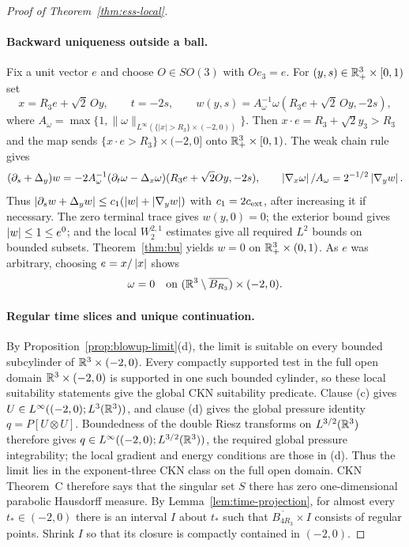 \documentclass[11pt,letterpaper]{article}
\numberwithin{equation}{section}
\theoremstyle{plain}
\theoremstyle{definition}
\theoremstyle{remark}
\begin{document}
\begin{proof}[Proof of Theorem~\ref{thm:ess-local}]
\paragraph{Backward uniqueness outside a ball.}
Fix a unit vector $e$ and choose $O\in SO(3)$ with $Oe_3=e$. For
$(y,s)\in\mathbb{R}^3_+\times[0,1)$ set
\[
 x=R_3e+\sqrt{2}\,Oy,\qquad t=-2s,\qquad
 w(y,s)=A_\omega^{-1}\omega(R_3e+\sqrt{2}\,Oy,-2s),
\]
where $A_\omega=\max\{1,\|\omega\|_{L^\infty(\{|x|>R_3\}\times(-2,0))}\}$.
Then $x\cdot e=R_3+\sqrt2 y_3>R_3$ and the map sends
$\{x\cdot e>R_3\}\times(-2,0]$ onto
$\mathbb{R}^3_+\times[0,1)$. The weak chain rule gives
\[
 (\partial_s+\Delta_y)w
 =-2A_\omega^{-1}(\partial_t\omega-\Delta_x\omega)
       (R_3e+\sqrt2 Oy,-2s),
 \qquad
 \left\lvert \nabla_x\omega\right\rvert/A_\omega=2^{-1/2}\left\lvert \nabla_y w\right\rvert.
\]
Thus
$\left\lvert \partial_s w+\Delta_yw\right\rvert\le c_1(\left\lvert w\right\rvert+\left\lvert \nabla_yw\right\rvert)$ with
$c_1=2c_{\rm ext}$, after increasing it if necessary. The zero terminal
trace gives $w(y,0)=0$; the exterior bound gives $\left\lvert w\right\rvert\le1\le e^0$;
and the local $W^{2,1}_2$ estimates give all required $L^2$ bounds on
bounded subsets. Theorem~\ref{thm:bu} yields $w=0$ on $\mathbb{R}^3_+\times(0,1)$.
As $e$ was arbitrary, choosing $e=x/\left\lvert x\right\rvert$ shows
\begin{equation}\label{eq:omega-exterior-zero}
 \omega=0\quad\text{on }(\mathbb{R}^3\setminus\overline{B_{R_3}})\times(-2,0).
\end{equation}

\paragraph{Regular time slices and unique continuation.}
By Proposition~\ref{prop:blowup-limit}(d), the limit is suitable on every
bounded subcylinder of $\mathbb{R}^3\times(-2,0)$. Every compactly supported test
in the full open domain $\mathbb{R}^3\times(-2,0)$ is supported in one such bounded
cylinder, so these local suitability statements give the global CKN
suitability predicate. Clause (c) gives
$U\in L^\infty((-2,0);L^3(\mathbb{R}^3))$, and clause (d) gives the global
pressure identity $q=P[U\otimes U]$. Boundedness of the double Riesz
transforms on $L^{3/2}(\mathbb{R}^3)$ therefore gives
$q\in L^\infty((-2,0);L^{3/2}(\mathbb{R}^3))$, the required global pressure
integrability; the local gradient and energy conditions are those in (d).
Thus the limit lies in the exponent-three CKN class on the full open
domain. CKN Theorem~C therefore says that the singular set $S$ there has
zero one-dimensional parabolic Hausdorff measure. By
Lemma~\ref{lem:time-projection}, for almost every $t_\ast\in(-2,0)$ there
is an interval $I$ about $t_\ast$ such that
$\overline{B_{4R_3}}\times I$ consists of regular points. Shrink $I$ so
that its closure is compactly contained in $(-2,0)$.


\end{proof}
\end{document}
